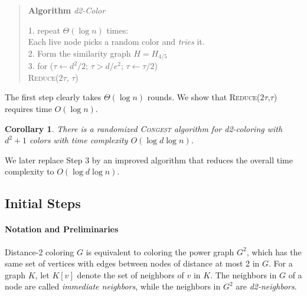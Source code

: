 \documentclass[12pt]{article}
\newtheorem{corollary}[theorem]{Corollary}
\newcommand{\alg}[1]{\textsc{#1}}
\newcommand{\congest}{\textsc{Congest}}
\begin{document}
\begin{quote}
   \textbf{Algorithm} \emph{d2-Color}

   1. repeat $\Theta(\log n)$ times: \\
   \hspace*{2em} Each live node picks a random color and \emph{tries} it. \\     
   2. Form the similarity graph $H=H_{4/5}$ \\
   3. for ($\tau \leftarrow d^2/2$; $\tau > d/e^2$; $\tau \leftarrow \tau/2$) \\
\hspace*{2em}      \alg{Reduce}($2 \tau$, $\tau$)
\end{quote}

The first step clearly takes $\Theta(\log n)$ rounds.
We show that \alg{Reduce}($2\tau$,$\tau$) requires time $O(\log n)$.
%
\begin{corollary}
  There is a randomized {\congest} algorithm for d2-coloring with $d^2+1$ colors with time complexity $O(\log d \log n)$.
\end{corollary}

We later replace Step 3 by an improved algorithm that reduces the overall time complexity to $O(\log d \log n)$.
\subsection{Initial Steps}

\paragraph*{Notation and Preliminaries}

Distance-2 coloring $G$ is equivalent to coloring the power graph $G^2$, which has the same set of vertices with edges between nodes of distance at most 2 in $G$.
For a graph $K$, let $K[v]$ denote the set of neighbors of $v$ in $K$.
The neighbors in $G$ of a node are called \emph{immediate neighbors}, while the neighbors in $G^2$ are \emph{d2-neighbors}.
\end{document}
